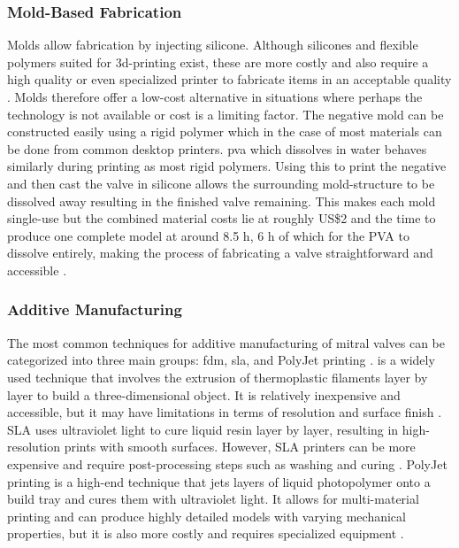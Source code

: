 \subsubsection{Mold-Based Fabrication}\label{subsubsec:mold_based_fabrication}
Molds allow fabrication by injecting silicone. Although silicones and flexible polymers suited for \gls{3d}-printing exist, these are more costly and also require a high quality or even specialized printer to fabricate items in an acceptable quality \cite{scanlan2018comparison}. Molds therefore offer a low-cost alternative in situations where perhaps the technology is not available or cost is a limiting factor. The negative mold can be constructed easily using a rigid polymer which in the case of most materials can be done from common desktop printers. \Gls{pva} which dissolves in water behaves similarly during printing as most rigid polymers. Using this to print the negative and then cast the valve in silicone allows the surrounding mold-structure to be dissolved away resulting in the finished valve remaining. This makes each mold single-use but the combined material costs lie at roughly US\$2 and the time to produce one complete model at around 8.5 h, 6 h of which for the PVA to dissolve entirely, making the process of fabricating a valve straightforward and accessible \cite{premyodhin20183d}. 

\subsubsection{Additive Manufacturing}\label{subsubsec:additive_manufacturing}
The most common techniques for additive manufacturing of mitral valves can be categorized into three main groups: \gls{fdm}, \gls{sla}, and PolyJet printing \cite{pavlykova20263d}.  is a widely used technique that involves the extrusion of thermoplastic filaments layer by layer to build a three-dimensional object. It is relatively inexpensive and accessible, but it may have limitations in terms of resolution and surface finish \cite{medellin2019design}. SLA uses ultraviolet light to cure liquid resin layer by layer, resulting in high-resolution prints with smooth surfaces. However, SLA printers can be more expensive and require post-processing steps such as washing and curing \cite{huang2020review}. PolyJet printing is a high-end technique that jets layers of liquid photopolymer onto a build tray and cures them with ultraviolet light. It allows for multi-material printing and can produce highly detailed models with varying mechanical properties, but it is also more costly and requires specialized equipment \cite{patpatiya2022review}.


